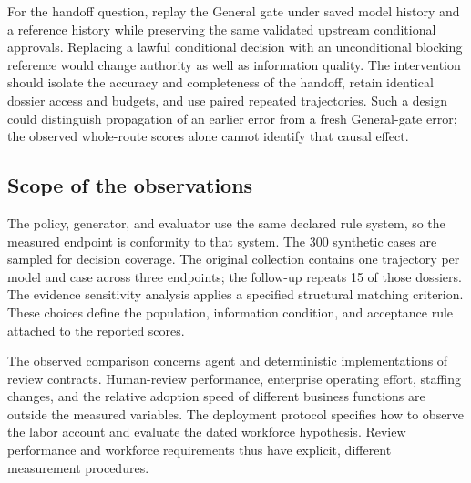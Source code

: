 For the handoff question, replay the General gate under saved model history and a reference
history while preserving the same validated upstream conditional approvals. Replacing a
lawful conditional decision with an unconditional blocking reference would change authority
as well as information quality. The intervention should isolate the accuracy and completeness
of the handoff, retain identical dossier access and budgets, and use paired repeated
trajectories. Such a design could distinguish propagation of an earlier error from a fresh
General-gate error; the observed whole-route scores alone cannot identify that causal effect.

\subsection{Scope of the observations}

The policy, generator, and evaluator use the same declared rule system, so the measured endpoint
is conformity to that system. The 300 synthetic cases are sampled for decision coverage.
The original collection contains one trajectory per model and case across three endpoints;
the follow-up repeats 15 of those dossiers. The evidence sensitivity analysis applies a
specified structural matching criterion. These choices define the population, information
condition, and acceptance rule attached to the reported scores.

The observed comparison concerns agent and deterministic implementations of review contracts.
Human-review performance, enterprise operating effort, staffing changes, and the relative
adoption speed of different business functions are outside the measured variables. The
deployment protocol specifies how to observe the labor account and evaluate the dated
workforce hypothesis. Review performance and workforce requirements thus have explicit,
different measurement procedures.
